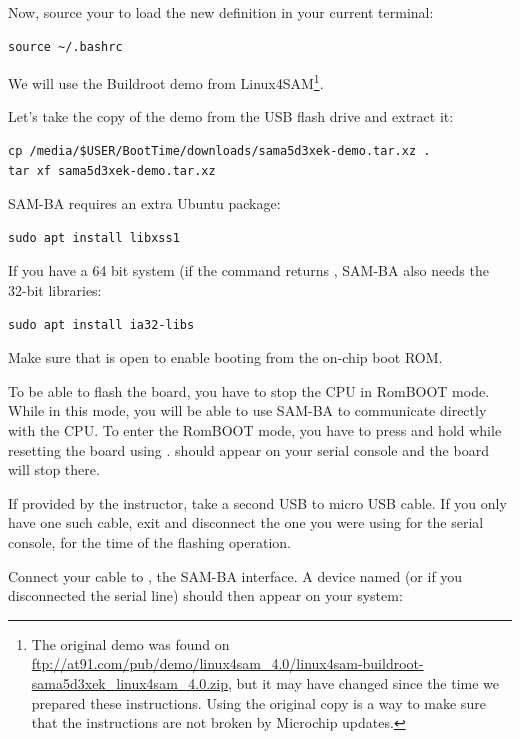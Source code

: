 Now, source your  to load the new definition in your
current terminal:
\begin{verbatim}
source ~/.bashrc
\end{verbatim}

We will use the Buildroot demo from Linux4SAM\footnote{The original demo
was found on
\url{ftp://at91.com/pub/demo/linux4sam_4.0/linux4sam-buildroot-sama5d3xek_linux4sam_4.0.zip},
but it may have changed since the time we prepared these instructions.
Using the original copy is a way to make sure that the instructions are
not broken by Microchip updates.}.

Let's take the copy of the demo from the USB flash drive and extract it:

\begin{verbatim}
cp /media/$USER/BootTime/downloads/sama5d3xek-demo.tar.xz .
tar xf sama5d3xek-demo.tar.xz
\end{verbatim}

SAM-BA requires an extra Ubuntu package:

\begin{verbatim}
sudo apt install libxss1
\end{verbatim}

If you have a 64 bit system (if the  command returns
, SAM-BA also needs the 32-bit libraries:

\begin{verbatim}
sudo apt install ia32-libs
\end{verbatim}

Make sure that  is open to enable booting from the
on-chip boot ROM.

To be able to flash the board, you have to stop the CPU in RomBOOT
mode. While in this mode, you will be able to use SAM-BA to
communicate directly with the CPU. To enter the RomBOOT mode, you have to
press and hold  while resetting the board using .
 should appear on your serial console and the board will
stop there.

If provided by the instructor, take a second USB to micro USB cable.
If you only have one such cable, exit  and disconnect
the one you were using for the serial console, for the time of the
flashing operation.

Connect your cable to , the SAM-BA interface. A device named
 (or  if you disconnected the
serial line) should then appear on your system:

